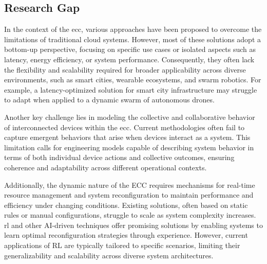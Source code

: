 \documentclass[runningheads]{llncs}
\begin{document}


\subsection{Research Gap}
\label{sec:research-gap}

In the context of the \ac{ecc},
various approaches have been proposed to overcome the limitations of traditional cloud systems.
%
However,
most of these solutions adopt a bottom-up perspective,
focusing on specific use cases or isolated aspects such as latency,
energy efficiency,
or system performance.
%
Consequently,
they often lack the flexibility and scalability required for broader applicability across diverse environments,
such as smart cities,
wearable ecosystems,
and swarm robotics.
%
For example,
a latency-optimized solution for smart city infrastructure may struggle to adapt when applied to a dynamic swarm of autonomous drones.

Another key challenge lies in modeling the collective and collaborative behavior of interconnected devices within the \ac{ecc}.
%
Current methodologies often fail to capture emergent behaviors that arise when devices interact as a system.
%
This limitation calls for engineering models capable of describing system behavior in terms of both individual device actions and collective outcomes,
ensuring coherence and adaptability across different operational contexts.

Additionally,
the dynamic nature of the ECC requires mechanisms for real-time resource management and system reconfiguration to maintain performance and efficiency under changing conditions.
%
Existing solutions,
often based on static rules or manual configurations, struggle to scale as system complexity increases.
%
\ac{rl} and other AI-driven techniques offer promising solutions by enabling systems to learn optimal reconfiguration strategies through experience.
%
However,
current applications of RL are typically tailored to specific scenarios,
limiting their generalizability and scalability across diverse system architectures.
\end{document}
